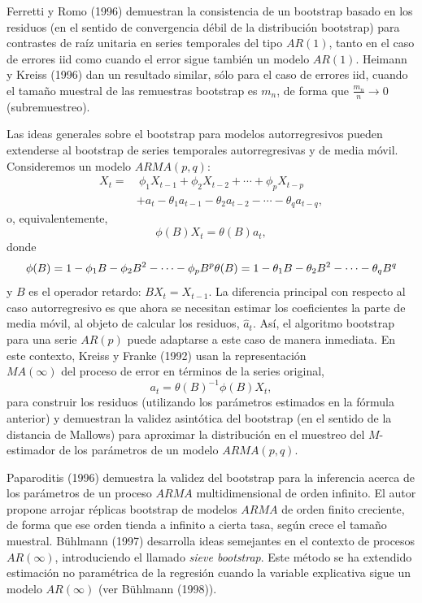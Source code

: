 \documentclass[
]{book}
\theoremstyle{break}
\theoremstyle{nonumberplain}
\begin{document}
Ferretti y Romo (1996) demuestran la consistencia de un bootstrap basado
en los residuos (en el sentido de convergencia débil de la distribución
bootstrap) para contrastes de raíz unitaria en series temporales del
tipo \(AR(1)\), tanto en el caso de errores iid como cuando el error sigue
también un modelo \(AR(1)\). Heimann y Kreiss (1996) dan un resultado
similar, sólo para el caso de errores iid, cuando el tamaño muestral de
las remuestras bootstrap es \(m_n\), de forma que \(\frac{m_n}{n}
\rightarrow 0\) (subremuestreo).

Las ideas generales sobre el bootstrap para modelos autorregresivos
pueden extenderse al bootstrap de series temporales autorregresivas y de
media móvil. Consideremos un modelo \(ARMA(p,q)\): \[\begin{aligned}
X_{t} =&\ \phi _1X_{t-1}+\phi _2X_{t-2}+\cdots +\phi _{p}X_{t-p} \\
&+a_{t}-\theta _1a_{t-1}-\theta _2a_{t-2}-\cdots -\theta _{q}a_{t-q},\end{aligned}\]o,
equivalentemente,
\[\phi (B)X_{t}=\theta (B)a_{t},\]
donde
\[\phi (B)=1-\phi _1B-\phi _2B^2-\cdots -\phi _{p}B^{p}\\ 
\theta(B)=1-\theta _1B-\theta _2B^2-\cdots -\theta _{q}B^{q}\]
y \(B\) es el operador retardo: \(BX_{t}=X_{t-1}\).
La diferencia principal con
respecto al caso autorregresivo es que ahora se necesitan estimar los
coeficientes la parte de media móvil, al objeto de calcular los
residuos, \(\widehat{a}_{t}\).
Así, el algoritmo bootstrap para una serie \(AR(p)\) puede
adaptarse a este caso de manera inmediata.
En este contexto, Kreiss y Franke (1992) usan la representación\\
\(MA(\infty )\) del proceso de error en términos de la series original,
\[a_{t}=\theta (B)^{-1}\phi(B) X_{t},\]
para construir los residuos
(utilizando los parámetros estimados en la fórmula anterior) y demuestran
la validez asintótica del bootstrap (en el sentido de la distancia de Mallows)
para aproximar la distribución en el muestreo del \(M\)-estimador de los
parámetros de un modelo \(ARMA(p,q)\).

Paparoditis (1996) demuestra la validez del bootstrap para la inferencia
acerca de los parámetros de un proceso \(ARMA\) multidimensional de orden
infinito. El autor propone arrojar réplicas bootstrap de modelos \(ARMA\)
de orden finito creciente, de forma que ese orden tienda a infinito a
cierta tasa, según crece el tamaño muestral. Bühlmann (1997) desarrolla
ideas semejantes en el contexto de procesos \(AR\left( \infty \right)\),
introduciendo el llamado \emph{sieve bootstrap}. Este método se ha extendido
estimación no paramétrica de la regresión cuando la variable explicativa
sigue un modelo \(AR\left( \infty \right)\) (ver Bühlmann (1998)).
\end{document}
